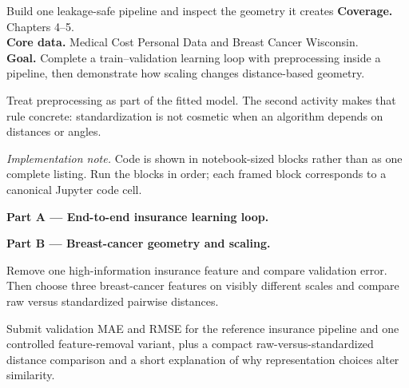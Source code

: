 
\begin{labproject}{Build one leakage-safe pipeline and inspect the geometry it creates}
\textbf{Coverage.} Chapters 4--5.\\
\textbf{Core data.} Medical Cost Personal Data and Breast Cancer Wisconsin.\\
\textbf{Goal.} Complete a train--validation learning loop with preprocessing inside a pipeline, then demonstrate how scaling changes distance-based geometry.

\begin{labmode}
Treat preprocessing as part of the fitted model. The second activity makes that rule concrete: standardization is not cosmetic when an algorithm depends on distances or angles.
\end{labmode}

\smallskip\noindent\textit{Implementation note.} Code is shown in notebook-sized blocks rather than as one complete listing. Run the blocks in order; each framed block corresponds to a canonical Jupyter code cell.\par

\medskip\noindent\textbf{Part A --- End-to-end insurance learning loop.}\par







\medskip\noindent\textbf{Part B --- Breast-cancer geometry and scaling.}\par







\begin{tryit}
Remove one high-information insurance feature and compare validation error. Then choose three breast-cancer features on visibly different scales and compare raw versus standardized pairwise distances.
\end{tryit}
\end{labproject}

\begin{labdeliverable}
Submit validation MAE and RMSE for the reference insurance pipeline and one controlled feature-removal variant, plus a compact raw-versus-standardized distance comparison and a short explanation of why representation choices alter similarity.
\end{labdeliverable}
